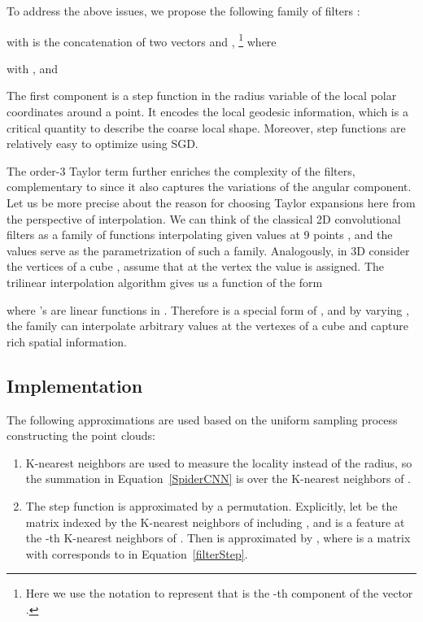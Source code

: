 \documentclass[runningheads]{llncs}
\begin{document}
To address the above issues, we propose the following family of filters :

with  is the concatenation of two vectors  and ,
\footnote{Here we use the notation  to represent that  is the -th component of the vector .}
where

with ,
and



The first component  is a step function in the radius variable of the local polar coordinates around a point. It encodes the local geodesic information, which is a critical quantity to describe the coarse local shape. Moreover, step functions are relatively easy to optimize using SGD. 


The order-3 Taylor term  further enriches the complexity of the filters, complementary to  since it also captures the variations of the angular component. Let us be more precise about the reason for choosing Taylor expansions here from the perspective of interpolation.
We can think of the classical 2D convolutional filters as a family of functions interpolating given values at 9 points , and the  values serve as the parametrization of such a family. Analogously, in 3D consider the vertices of a cube , assume that at the vertex  the value  is assigned. The trilinear interpolation algorithm gives us a function of the form 
 
where 's are linear functions in . Therefore  is a special form of , and by varying , the family  can interpolate arbitrary values at the vertexes of a cube and capture rich spatial information.

\subsection{Implementation} \label{implementation}
The following approximations are used based on the uniform sampling process constructing the point clouds:
\begin{enumerate}
\item 
K-nearest neighbors are used to measure the locality instead of the radius, so the summation in Equation~\ref{SpiderCNN} is over the K-nearest neighbors of .  
\item
The step function  is approximated by a permutation. Explicitly, let  be the  matrix indexed by the K-nearest neighbors of  including , and  is a feature at the -th K-nearest neighbors of . Then  is approximated by , where  is a  matrix with  corresponds to   in Equation~\ref{filterStep}. 
\end{enumerate}
\end{document}
